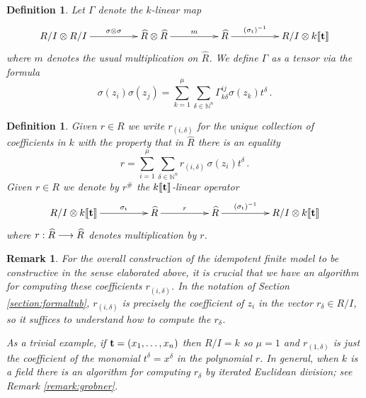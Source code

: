 \documentclass[english,letter paper,12pt,leqno]{article}
\theoremstyle{example}
\newtheorem{definition}[theorem]{Definition}
\newtheorem{remark}[theorem]{Remark}
\numberwithin{equation}{section}
\DeclareMathOperator{\sigmastar}{\sigma_t}
\begin{document}
\begin{definition}\label{defn_gamma} Let $\Gamma$ denote the $k$-linear map
\[
\xymatrix@C+2pc{
R/I \otimes R/I \ar[r]^-{ \sigma \otimes \sigma } & \widehat{R} \otimes \widehat{R} \ar[r]^-{m} & \widehat{R} \ar[r]^-{(\sigmastar)^{-1}} & R/I \otimes k\llbracket \bold{t} \rrbracket
}
\]
where $m$ denotes the usual multiplication on $\widehat{R}$. We define $\Gamma$ as a tensor via the formula
\[
\sigma(z_i)\sigma(z_j) = \sum_{k=1}^\mu \sum_{\delta \in \mathbb{N}^n} \Gamma^{ij}_{k \delta} \sigma(z_k) t^\delta\,.
\]
\end{definition}

\begin{definition}\label{defn:rsharp} Given $r \in R$ we write $r_{(i,\delta)}$ for the unique collection of coefficients in $k$ with the property that in $\widehat{R}$ there is an equality
\[
r = \sum_{i = 1}^\mu \sum_{\delta \in \mathbb{N}^n} r_{(i,\delta)} \,\sigma(z_i) t^{\delta}\,.
\]
Given $r \in R$ we denote by $r^{\#}$ the $k\llbracket \bold{t} \rrbracket$-linear operator
\[
\xymatrix@C+2pc{
R/I \otimes k\llbracket \bold{t} \rrbracket \ar[r]^-{\sigmastar} & \widehat{R} \ar[r]^{r} & \widehat{R} \ar[r]^-{(\sigmastar)^{-1}} & R/I \otimes k\llbracket \bold{t} \rrbracket
}
\]
where $r: \widehat{R} \longrightarrow \widehat{R}$ denotes multiplication by $r$.
\end{definition}

\begin{remark} For the overall construction of the idempotent finite model to be \emph{constructive} in the sense elaborated above, it is crucial that we have an algorithm for computing these coefficients $r_{(i, \delta)}$. In the notation of Section \ref{section:formaltub}, $r_{(i, \delta)}$ is precisely the coefficient of $z_i$ in the vector $r_\delta \in R/I$, so it suffices to understand how to compute the $r_\delta$.

As a trivial example, if $\bold{t} = (x_1,\ldots,x_n)$ then $R/I = k$ so $\mu = 1$ and $r_{(1,\delta)}$ is just the coefficient of the monomial $t^{\delta} = x^{\delta}$ in the polynomial $r$. In general, when $k$ is a field there is an algorithm for computing $r_\delta$ by iterated Euclidean division; see Remark \ref{remark:grobner}.
\end{remark}
\end{document}
